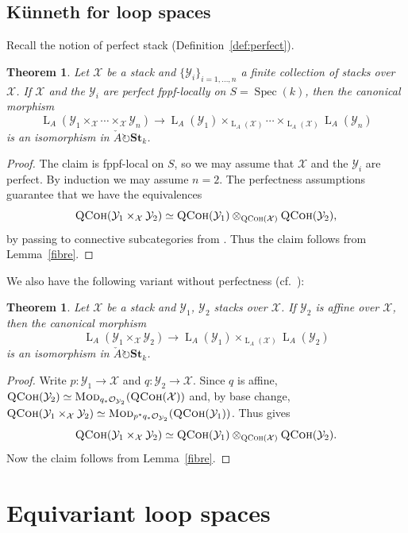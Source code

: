\documentclass[12pt, oneside]{amsart}
\numberwithin{equation}{section}
\newtheorem{theorem}[subsubsection]{Theorem}
\theoremstyle{remark}
\theoremstyle{plain}
\newcommand{\Mod}{\textsc{Mod}}
\DeclareMathOperator{\QCoh}{\textsc{QCoh}}
\newcommand{\Loop}{\operatorname{L}}
\newcommand{\OO}{\mathcal{O}}
\newcommand{\YY}{\mathcal{Y}}
\newcommand{\XX}{\mathcal{X}}
\DeclareMathOperator{\spc}{Spec}
\newcommand{\Stk}{\mathbf{St}_{k}}
\begin{document}
\subsection{K\"unneth for loop spaces}

Recall the notion of perfect stack (Definition~\ref{def:perfect}).

\begin{theorem}\label{Kun} Let $\XX$ be a stack and $\{\YY_i\}_{i=1,\ldots,n}$ a finite collection of stacks over $\XX$.  If $\XX$ and the $\YY_i$ are perfect fppf-locally on $S=\spc(k)$, then the canonical morphism
$$ \Loop_A(\YY_1 \times_{\XX} \cdots \times_{\XX} \YY_n) \longrightarrow \Loop_A(\YY_1) \times_{\Loop_A(\XX)} \cdots \times_{\Loop_A(\XX)} \Loop_A(\YY_n) $$
is an isomorphism in $\check{A}\circlearrowright \Stk$. \end{theorem}

\begin{proof} The claim is fppf-local on $S$, so we may assume that $\XX$ and the $\YY_i$ are perfect. By induction we may assume $n=2$. The perfectness assumptions guarantee that we have the equivalences \[\QCoh(\YY_1 \times_{\XX} \YY_2) \simeq \QCoh(\YY_1) \otimes_{\QCoh(\XX)} \QCoh(\YY_2), \] by passing to connective subcategories from \cite[Thm.~1.2(i)]{BFN}. Thus the claim follows from Lemma~\ref{fibre}. \end{proof}

We also have the following variant without perfectness (cf.\ \cite[Vol.~I, Chap.~3, Prop.~3.3.5]{GR}):

\begin{theorem}\label{thm:Kun affine}
  Let $\XX$ be a stack and $\YY_1$, $\YY_2$ stacks over $\XX$.
  If $\YY_2$ is affine over $\XX$, then the canonical morphism
  $$ \Loop_A(\YY_1 \times_{\XX} \YY_2) \longrightarrow \Loop_A(\YY_1) \times_{\Loop_A(\XX)} \Loop_A(\YY_2) $$
  is an isomorphism in $\check{A}\circlearrowright \Stk$.
\end{theorem}
\begin{proof}
  Write $p : \YY_1 \to \XX$ and $q : \YY_2 \to \XX$.
  Since $q$ is affine, $\QCoh(\YY_2) \simeq \Mod_{q_*\OO_{\YY_2}}(\QCoh(\XX))$ and, by base change, $\QCoh(\YY_1 \times_{\XX} \YY_2) \simeq \Mod_{p^*q_*\OO_{\YY_2}}(\QCoh(\YY_1))$.
  Thus \cite[Thm.~4.8.4.6]{LurieHA} gives
  \[ \QCoh(\YY_1 \times_{\XX} \YY_2) \simeq \QCoh(\YY_1) \otimes_{\QCoh(\XX)} \QCoh(\YY_2). \]
  Now the claim follows from Lemma~\ref{fibre}.
\end{proof}

\section{Equivariant loop spaces}\label{sec:loops BG}
\end{document}
